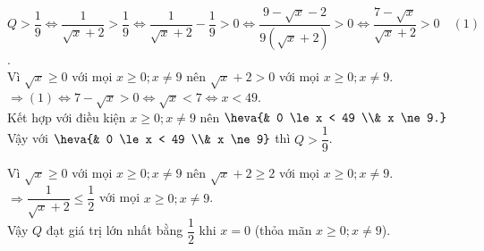 \documentclass[12pt]{article}
\begin{document}
\begin{bt}
{\begin{cacy}
\item $Q > \dfrac{1}{9} \Leftrightarrow \dfrac{1}{\sqrt{x}+2} > \dfrac{1}{9} \Leftrightarrow \dfrac{1}{\sqrt{x}+2} - \dfrac{1}{9} > 0 \Leftrightarrow \dfrac{9-\sqrt{x}-2}{9\left(\sqrt{x}+2\right)} > 0 \Leftrightarrow \dfrac{7-\sqrt{x}}{\sqrt{x}+2} > 0 \quad (1)$.\\
Vì $\sqrt{x} \ge 0$ với mọi $x \ge 0; x \ne 9$ nên $\sqrt{x}+2 > 0$ với mọi $x \ge 0; x \ne 9$.\\
$\Rightarrow (1) \Leftrightarrow 7-\sqrt{x} > 0 \Leftrightarrow \sqrt{x} < 7 \Leftrightarrow x < 49$.\\
Kết hợp với điều kiện $x \ge 0; x \ne 9$ nên $\heva{& 0 \le x < 49 \\& x \ne 9.}$\\
Vậy với $\heva{& 0 \le x < 49 \\& x \ne 9}$ thì $Q > \dfrac{1}{9}$.

\item Vì $\sqrt{x} \ge 0$ với mọi $x \ge 0; x \ne 9$ nên $\sqrt{x}+2 \ge 2$ với mọi $x \ge 0; x \ne 9$.\\
$\Rightarrow \dfrac{1}{\sqrt{x}+2} \le \dfrac{1}{2}$ với mọi $x \ge 0; x \ne 9$.\\
Vậy $Q$ đạt giá trị lớn nhất bằng $\dfrac{1}{2}$ khi $x = 0$ (thỏa mãn $x \ge 0; x \ne 9$).
\end{cacy}
}
\end{bt}
\end{document}
